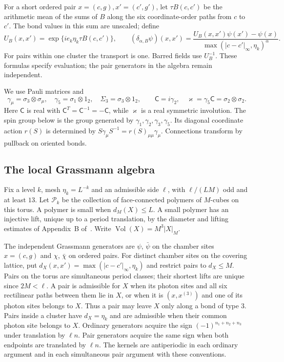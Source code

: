 \documentclass[11pt,letterpaper,reqno]{amsart}
\newcommand{\extref}[2]{#1 of~\cite{#2}}
\begin{document}
For a short ordered pair \(x=(c,g),x'=(c',g')\), let
\(\tau B(c,c')\) be the arithmetic mean of the sums of \(B\)
along the six coordinate-order paths from \(c\) to \(c'\).
The bond values in this sum are unscaled; define
\[
 U_B(x,x')=\exp\{ie_k\eta_k\tau B(c,c')\},\qquad
 (\delta_{\alpha,B}\psi)(x,x')
       =\frac{U_B(x,x')\psi(x')-\psi(x)}
                    {\max(|c-c'|_\infty,\eta_k)^\alpha}.
\]
For pairs within one cluster the transport is one. Barred fields
use \(U_B^{-1}\). These formulas specify evaluation; the pair
generators in the algebra remain independent.

We use Pauli matrices and
\[
 \gamma_\mu=\sigma_3\otimes\sigma_\mu,\quad
 \gamma_5=\sigma_1\otimes1_2,\quad \Sigma_3=\sigma_3\otimes1_2,
 \qquad
 \mathsf C=i\gamma_2,\quad
 \varkappa=\gamma_5\mathsf C=\sigma_2\otimes\sigma_2 .
\]
Here \(\mathsf C\) is real with
\(\mathsf C^T=\mathsf C^{-1}=-\mathsf C\), while
\(\varkappa\) is a real symmetric involution. The spin group below
is the group generated by \(\gamma_1,\gamma_2,\gamma_3,\gamma_5\).
Its diagonal coordinate action \(r(S)\) is determined by
\(S\gamma_\mu S^{-1}=r(S)_{\mu\mu}\gamma_\mu\).
Connections transform by pullback on oriented bonds.

\subsection{The local Grassmann algebra}
\label{subsec:rg-activity-spaces}

Fix a level $k$, mesh $\eta_k=L^{-k}$ and an admissible side
$\ell$, with $\ell/(LM)$ odd and at least $13$.
Let $\mathcal P_k$ be the collection of face-connected polymers
of $M$-cubes on this torus. A polymer is small when
$d_M(X)\le L$. A small polymer has an injective lift, unique up
to a period translation, by the diameter and lifting estimates
of Appendix~\extref{B}{NormalizedContraction}.
Write $\operatorname{Vol}(X)=M^3|X|_M$.

The independent Grassmann generators are $\psi$, $\bar\psi$ on
the chamber sites $x=(c,g)$ and $\chi$, $\bar\chi$ on ordered
pairs. For distinct chamber sites on the covering lattice, put
$d_X(x,x')=\max(|c-c'|_\infty,\eta_k)$ and restrict pairs to
$d_X\le M$. Pairs on the torus are simultaneous period classes;
their shortest lifts are unique since $2M<\ell$. A pair is
admissible for $X$ when its photon sites and all six rectilinear
paths between them lie in $X$, or when it is $(x,x^{(3)})$ and
one of its photon sites belongs to $X$.
Thus a pair may leave $X$ only along a bond of type $3$.
Pairs inside a cluster have $d_X=\eta_k$ and are admissible when
their common photon site belongs to $X$.
Ordinary generators acquire the sign $(-1)^{n_1+n_2+n_3}$
under translation by $\ell n$. Pair generators acquire the same
sign when both endpoints are translated by $\ell n$.
The kernels are antiperiodic in each ordinary argument and in
each simultaneous pair argument with these conventions.
\end{document}
